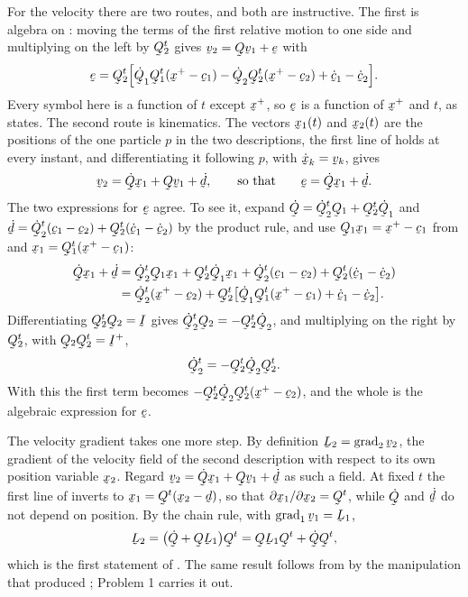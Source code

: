 For the velocity there are two routes, and both are instructive. The
first is algebra on : moving the terms of the first relative
motion to one side and multiplying on the left by $\bQ_{2}^{t}$ gives
$\bv_{2}=\bQ\bv_{1}+\be$ with
\[
   \be=\bQ_{2}^{t}\Big[\dot\bQ_{1}\bQ_{1}^{t}(\bx^{+}-\bc_{1})
   -\dot\bQ_{2}\bQ_{2}^{t}(\bx^{+}-\bc_{2})+\dot\bc_{1}-\dot\bc_{2}\Big].
\]
Every symbol here is a function of $t$ except $\bx^{+}$, so $\be$ is a
function of $\bx^{+}$ and $t$, as  states. The second route is
kinematics. The vectors $\bx_{1}(t)$ and $\bx_{2}(t)$ are the positions
of the one particle $p$ in the two descriptions, the first line of
 holds at every instant, and differentiating it following $p$,
with $\dot\bx_{k}=\bv_{k}$, gives
\[
   \bv_{2}=\dot\bQ\bx_{1}+\bQ\bv_{1}+\dot\bd,
   \qquad\text{so that}\qquad
   \be=\dot\bQ\bx_{1}+\dot\bd .
\]
The two expressions for $\be$ agree. To see it, expand
$\dot\bQ=\dot\bQ_{2}^{t}\bQ_{1}+\bQ_{2}^{t}\dot\bQ_{1}$ and
$\dot\bd=\dot\bQ_{2}^{t}(\bc_{1}-\bc_{2})+\bQ_{2}^{t}(\dot\bc_{1}
-\dot\bc_{2})$ by the product rule, and use $\bQ_{1}\bx_{1}
=\bx^{+}-\bc_{1}$ from  and $\bx_{1}=\bQ_{1}^{t}(\bx^{+}
-\bc_{1})$:
\[
\begin{aligned}
   \dot\bQ\bx_{1}+\dot\bd
   &=\dot\bQ_{2}^{t}\bQ_{1}\bx_{1}+\bQ_{2}^{t}\dot\bQ_{1}\bx_{1}
     +\dot\bQ_{2}^{t}(\bc_{1}-\bc_{2})
     +\bQ_{2}^{t}(\dot\bc_{1}-\dot\bc_{2})\\
   &=\dot\bQ_{2}^{t}(\bx^{+}-\bc_{2})
     +\bQ_{2}^{t}\big[\dot\bQ_{1}\bQ_{1}^{t}(\bx^{+}-\bc_{1})
     +\dot\bc_{1}-\dot\bc_{2}\big].
\end{aligned}
\]
Differentiating $\bQ_{2}^{t}\bQ_{2}=\I$ gives
$\dot\bQ_{2}^{t}\bQ_{2}=-\bQ_{2}^{t}\dot\bQ_{2}$, and multiplying on the
right by $\bQ_{2}^{t}$, with $\bQ_{2}\bQ_{2}^{t}=\I^{+}$,
\[
   \dot\bQ_{2}^{t}=-\bQ_{2}^{t}\dot\bQ_{2}\bQ_{2}^{t}.
\]
With this the first term becomes
$-\bQ_{2}^{t}\dot\bQ_{2}\bQ_{2}^{t}(\bx^{+}-\bc_{2})$, and the whole is
the algebraic expression for $\be$.

The velocity gradient takes one more step. By definition
$\bL_{2}=\grad_{2}\bv_{2}$, the gradient of the velocity field of the
second description with respect to its own position variable $\bx_{2}$.
Regard $\bv_{2}=\dot\bQ\bx_{1}+\bQ\bv_{1}+\dot\bd$ as such a field. At
fixed $t$ the first line of  inverts to
$\bx_{1}=\bQ^{t}(\bx_{2}-\bd)$, so that
$\partial\bx_{1}/\partial\bx_{2}=\bQ^{t}$, while $\dot\bQ$ and
$\dot\bd$ do not depend on position. By the chain rule, with
$\grad_{1}\bv_{1}=\bL_{1}$,
\[
   \bL_{2}=\big(\dot\bQ+\bQ\bL_{1}\big)\bQ^{t}
   =\bQ\bL_{1}\bQ^{t}+\dot\bQ\bQ^{t},
\]
which is the first statement of . The same result follows from
 by the manipulation that produced ; Problem 1
carries it out.

